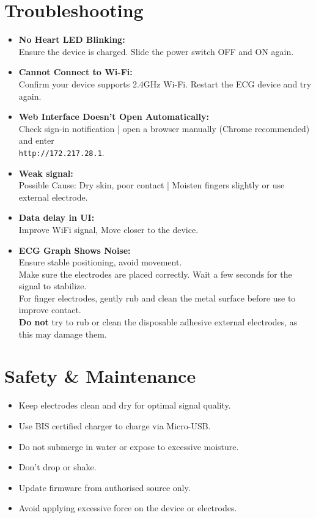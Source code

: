 \section{Troubleshooting}
\begin{itemize}
    \item \textbf{No Heart LED Blinking:} \\
    Ensure the device is charged. Slide the power switch OFF and ON again.

    \item \textbf{Cannot Connect to Wi-Fi:} \\
    Confirm your device supports 2.4GHz Wi-Fi. Restart the ECG device and try again.

    \item \textbf{Web Interface Doesn’t Open Automatically:} \\
    Check sign-in notification | open a browser manually (Chrome recommended) and enter\\ \texttt{http://172.217.28.1}.

    \item \textbf{Weak signal:} \\
    Possible Cause: Dry skin, poor contact | Moisten fingers slightly or use external electrode.

    \item \textbf{Data delay in UI:} \\
    Improve WiFi signal, Move closer to the device.

    \item \textbf{ECG Graph Shows Noise:} \\
    Ensure stable positioning, avoid movement. \\
    Make sure the electrodes are placed correctly. Wait a few seconds for the signal to stabilize. \\
    For finger electrodes, gently rub and clean the metal surface before use to improve contact. \\
    \textbf{Do not} try to rub or clean the disposable adhesive external electrodes, as this may damage them.
\end{itemize}

\section{Safety \& Maintenance}
\begin{itemize}[leftmargin=*]
  \item Keep electrodes clean and dry for optimal signal quality.
  \item Use BIS certified charger to charge via Micro-USB.
  \item Do not submerge in water or expose to excessive moisture.
  \item Don't drop or shake.
  \item Update firmware from authorised source only.
  \item Avoid applying excessive force on the device or electrodes.
\end{itemize}












